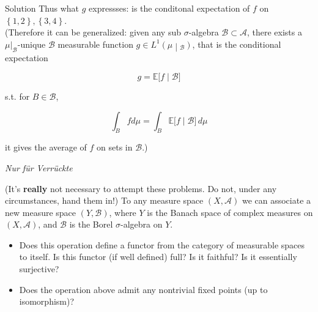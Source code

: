 \begin{qlsolution}{Solution}
Thus what \(g\) expressses: is the conditonal expectation of \(f\) on \(\left\{ {1,2} \right\},\left\{ {3,4} \right\}\).\\
(Therefore it can be generalized: given any sub \(\sigma\)-algebra \(\mathcal{B} \subset \mathcal{A}\), there exists a \(\mu|_{\mathcal{B}}\)-unique \(\mathcal{B}\) measurable function \(\left. g \in L^{1}(\mu \middle| {}_{\mathcal{B}}) \right.\), that is the conditional expectation

\[g = \mathbb{E}\lbrack f \mid \mathcal{B}\rbrack\]

s.t. for \(B \in \mathcal{B}\),

\[\int_{B}fd\mu = \int_{B}\mathbb{E}\lbrack f \mid \mathcal{B}\rbrack\, d\mu\]

it gives the average of \(f\) on sets in \(\mathcal{B}\).)

\end{qlsolution}

\emph{Nur für Verrückte}

(It's \textbf{really} not necessary to attempt these problems. Do not, under any circumstances, hand them in!) To any measure space \((X,\mathcal{A})\) we can associate a new measure space \((Y,\mathcal{B})\), where \(Y\) is the Banach space of complex measures on \((X,\mathcal{A})\), and \(\mathcal{B}\) is the Borel \(\sigma\)-algebra on \(Y\).

\begin{itemize}
\item
  Does this operation define a functor from the category of measurable spaces to itself. Is this functor (if well defined) full? Is it faithful? Is it essentially surjective?
\item
  Does the operation above admit any nontrivial fixed points (up to isomorphism)?
\end{itemize}
